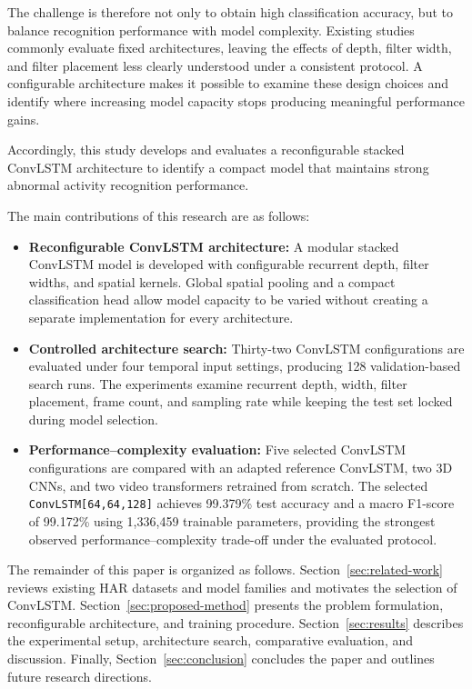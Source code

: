 \documentclass[journal,article,submit,moreauthors]{Definitions/mdpi}
\begin{document}
    The challenge is therefore not only to obtain high classification accuracy, but to 
    balance recognition performance with model complexity. Existing studies commonly 
    evaluate fixed architectures, leaving the effects of depth, filter width, and filter 
    placement less clearly understood under a consistent protocol. A configurable 
    architecture makes it possible to examine these design choices and identify where 
    increasing model capacity stops producing meaningful performance gains.

    Accordingly, this study develops and evaluates a reconfigurable stacked ConvLSTM 
    architecture to identify a compact model that maintains strong abnormal activity
    recognition performance.

    The main contributions of this research are as follows:

    \begin{itemize}
        \item \textbf{Reconfigurable ConvLSTM architecture:}
        A modular stacked ConvLSTM model is developed with configurable recurrent 
        depth, filter widths, and spatial kernels. Global spatial pooling and a 
        compact classification head allow model capacity to be varied without 
        creating a separate implementation for every architecture.

        \item \textbf{Controlled architecture search:}
        Thirty-two ConvLSTM configurations are evaluated under four temporal input 
        settings, producing 128 validation-based search runs. The experiments 
        examine recurrent depth, width, filter placement, frame count, and sampling 
        rate while keeping the test set locked during model selection.

        \item \textbf{Performance--complexity evaluation:}
        Five selected ConvLSTM configurations are compared with an adapted reference 
        ConvLSTM, two 3D CNNs, and two video transformers retrained from scratch. The 
        selected \texttt{ConvLSTM[64,64,128]} achieves 99.379\% test accuracy and a 
        macro F1-score of 99.172\% using 1,336,459 trainable parameters, providing 
        the strongest observed performance--complexity trade-off under the 
        evaluated protocol.
    \end{itemize}

    The remainder of this paper is organized as follows. Section~\ref{sec:related-work} 
    reviews existing HAR datasets and model families and motivates the selection of 
    ConvLSTM. Section~\ref{sec:proposed-method} presents the problem formulation, 
    reconfigurable architecture, and training procedure. Section~\ref{sec:results} 
    describes the experimental setup, architecture search, comparative evaluation, 
    and discussion. Finally, Section~\ref{sec:conclusion} concludes the paper and 
    outlines future research directions.
\end{document}
